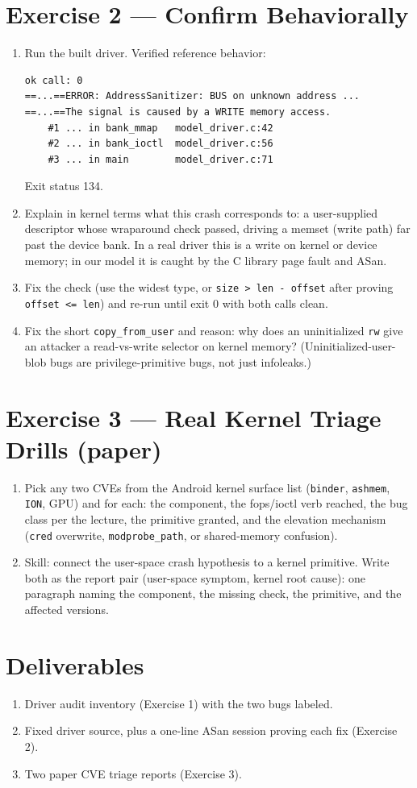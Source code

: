 \documentclass[12pt]{Training}
\begin{document}
\section*{Exercise 2 --- Confirm Behaviorally}
\begin{enumerate}
    \item Run the built driver. Verified reference behavior:
        \begin{lstlisting}
ok call: 0
==...==ERROR: AddressSanitizer: BUS on unknown address ...
==...==The signal is caused by a WRITE memory access.
    #1 ... in bank_mmap   model_driver.c:42
    #2 ... in bank_ioctl  model_driver.c:56
    #3 ... in main        model_driver.c:71
        \end{lstlisting}
        Exit status 134.
    \item Explain in kernel terms what this crash corresponds to: a user-supplied descriptor whose wraparound check passed, driving a memset (write path) far past the device bank. In a real driver this is a write on kernel or device memory; in our model it is caught by the C library page fault and ASan.
    \item Fix the check (use the widest type, or \lstinline{size > len - offset} after proving \lstinline{offset <= len}) and re-run until exit 0 with both calls clean.
    \item Fix the short \lstinline{copy_from_user} and reason: why does an uninitialized \lstinline{rw} give an attacker a read-vs-write selector on kernel memory? (Uninitialized-user-blob bugs are privilege-primitive bugs, not just infoleaks.)
\end{enumerate}

\section*{Exercise 3 --- Real Kernel Triage Drills (paper)}
\begin{enumerate}
    \item Pick any two CVEs from the Android kernel surface list (\lstinline{binder}, \lstinline{ashmem}, \lstinline{ION}, GPU) and for each: the component, the fops/ioctl verb reached, the bug class per the lecture, the primitive granted, and the elevation mechanism (\lstinline{cred} overwrite, \lstinline{modprobe_path}, or shared-memory confusion).
    \item Skill: connect the user-space crash hypothesis to a kernel primitive. Write both as the report pair (user-space symptom, kernel root cause): one paragraph naming the component, the missing check, the primitive, and the affected versions.
\end{enumerate}

\section*{Deliverables}
\begin{enumerate}
    \item Driver audit inventory (Exercise 1) with the two bugs labeled.
    \item Fixed driver source, plus a one-line ASan session proving each fix (Exercise 2).
    \item Two paper CVE triage reports (Exercise 3).
\end{enumerate}
\end{document}

